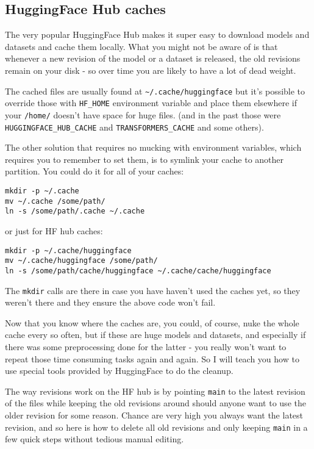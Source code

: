 \documentclass[
]{report}
\begin{document}
\subsection{HuggingFace Hub caches}\label{huggingface-hub-caches}

The very popular HuggingFace Hub makes it super easy to download models
and datasets and cache them locally. What you might not be aware of is
that whenever a new revision of the model or a dataset is released, the
old revisions remain on your disk - so over time you are likely to have
a lot of dead weight.

The cached files are usually found at
\texttt{\textasciitilde{}/.cache/huggingface} but it's possible to
override those with \texttt{HF\_HOME} environment variable and place
them elsewhere if your \texttt{/home/} doesn't have space for huge
files. (and in the past those were \texttt{HUGGINGFACE\_HUB\_CACHE} and
\texttt{TRANSFORMERS\_CACHE} and some others).

The other solution that requires no mucking with environment variables,
which requires you to remember to set them, is to symlink your cache to
another partition. You could do it for all of your caches:

\begin{verbatim}
mkdir -p ~/.cache
mv ~/.cache /some/path/
ln -s /some/path/.cache ~/.cache
\end{verbatim}

or just for HF hub caches:

\begin{verbatim}
mkdir -p ~/.cache/huggingface
mv ~/.cache/huggingface /some/path/
ln -s /some/path/cache/huggingface ~/.cache/cache/huggingface
\end{verbatim}

The \texttt{mkdir} calls are there in case you have haven't used the
caches yet, so they weren't there and they ensure the above code won't
fail.

Now that you know where the caches are, you could, of course, nuke the
whole cache every so often, but if these are huge models and datasets,
and especially if there was some preprocessing done for the latter - you
really won't want to repeat those time consuming tasks again and again.
So I will teach you how to use special tools provided by HuggingFace to
do the cleanup.

The way revisions work on the HF hub is by pointing \texttt{main} to the
latest revision of the files while keeping the old revisions around
should anyone want to use the older revision for some reason. Chance are
very high you always want the latest revision, and so here is how to
delete all old revisions and only keeping \texttt{main} in a few quick
steps without tedious manual editing.
\end{document}
